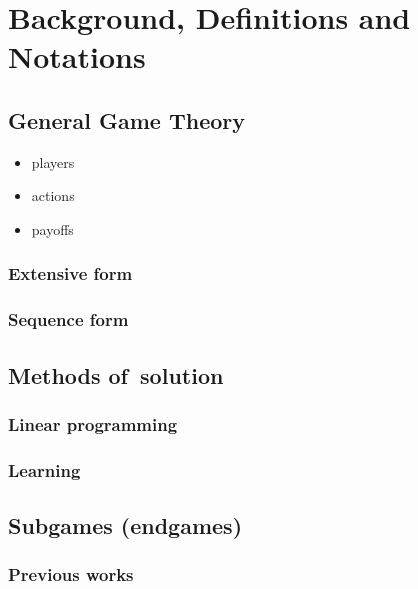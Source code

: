 \chapter{Background, Definitions and Notations}

\todo

\section{General Game Theory}

\begin{itemize}
  \item players
  \item actions
  \item payoffs
\end{itemize}

\subsection{Extensive form}

\subsection{Sequence form}

\section{Methods of~solution}

\subsection{Linear programming}

\subsection{Learning}

\section{Subgames (endgames)}

\subsection{Previous works}
